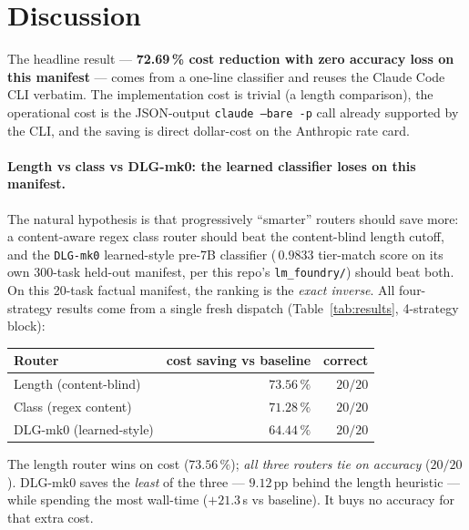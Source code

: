 \documentclass[11pt,a4paper]{article}
\begin{document}
\section{Discussion}
\label{sec:discussion}

The headline result --- \textbf{72.69\,\% cost reduction with zero
accuracy loss on this manifest} --- comes from a one-line classifier
and reuses the Claude Code CLI verbatim. The implementation cost is
trivial (a length comparison), the operational cost is the JSON-output
\texttt{claude --bare -p} call already supported by the CLI, and the
saving is direct dollar-cost on the Anthropic rate card.

\paragraph{Length vs class vs DLG-mk0: the learned classifier loses
on this manifest.} The natural hypothesis is that progressively
``smarter'' routers should save more: a content-aware regex class
router should beat the content-blind length cutoff, and the
\texttt{DLG-mk0} learned-style pre-7B classifier
($\,0.9833$ tier-match score on its own 300-task held-out manifest,
per this repo's \texttt{lm\_foundry/}) should beat both. On this
20-task factual manifest, the ranking is the \emph{exact inverse}.
All four-strategy results come from a single fresh dispatch
(Table~\ref{tab:results}, 4-strategy block):
\begin{center}
\begin{tabular}{lrr}
\toprule
\textbf{Router} & \textbf{cost saving vs baseline} & \textbf{correct} \\
\midrule
Length (content-blind) & $\mathbf{73.56\,\%}$ & $20/20$ \\
Class (regex content)  & $71.28\,\%$          & $20/20$ \\
DLG-mk0 (learned-style) & $64.44\,\%$         & $20/20$ \\
\bottomrule
\end{tabular}
\end{center}
The length router wins on cost ($73.56\,\%$); \emph{all three routers
tie on accuracy} ($20/20$). DLG-mk0 saves the \emph{least} of the
three --- $9.12$\,pp behind the length heuristic --- while spending the
most wall-time ($+21.3\,$s vs baseline). It buys no accuracy for that
extra cost.
\end{document}
